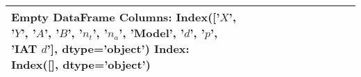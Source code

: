 \begin{tabular}{llllllllllr}
\toprule
Empty DataFrame
Columns: Index(['$X$', '$Y$', '$A$', '$B$', '$n_t$', '$n_a$', 'Model', '$d$', '$p$',
       'IAT $d$'],
      dtype='object')
Index: Index([], dtype='object') \\
\bottomrule
\end{tabular}

